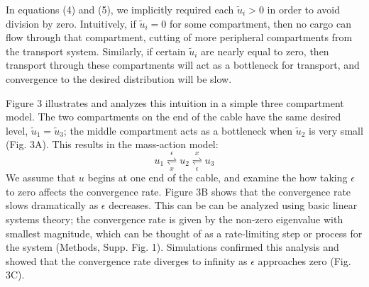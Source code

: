 \documentclass[10pt]{wlpeerj}
\begin{document}
In equations (4) and (5), we implicitly required each $\tilde{u}_i > 0$ in order to avoid division by zero.
Intuitively, if $\tilde{u}_i = 0$ for some compartment, then no cargo can flow through that compartment, cutting of more peripheral compartments from the transport system.
Similarly, if certain $\tilde{u}_i$ are nearly equal to zero, then transport through these compartments will act as a bottleneck for transport, and convergence to the desired distribution will be slow.

Figure 3 illustrates and analyzes this intuition in a simple three compartment model.
The two compartments on the end of the cable have the same desired level, $\tilde{u}_1 = \tilde{u}_3$; the middle compartment acts as a bottleneck when $\tilde{u}_2$ is very small (Fig. 3A).
This results in the mass-action model:
\begin{equation}
u_1 \underset{x}{\overset{\epsilon}{\rightleftharpoons}} u_2 \underset{\epsilon}{\overset{x}{\rightleftharpoons}} u_3
\end{equation}
We assume that $u$ begins at one end of the cable, and examine the how taking $\epsilon$ to zero affects the convergence rate.
Figure 3B shows that the convergence rate slows dramatically as $\epsilon$ decreases.
This can be can be analyzed using basic linear systems theory; the convergence rate is given by the non-zero eigenvalue with smallest magnitude, which can be thought of as a rate-limiting step or process for the system (Methods, Supp. Fig. 1).
Simulations confirmed this analysis and showed that the convergence rate diverges to infinity as $\epsilon$ approaches zero (Fig. 3C).
\end{document}
